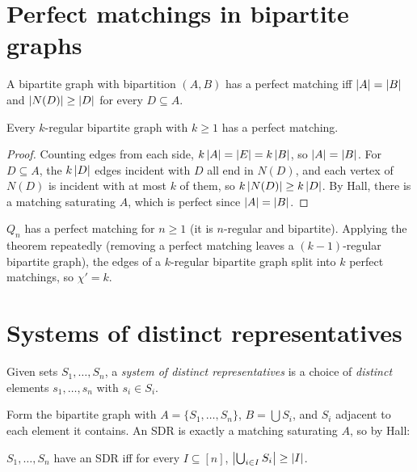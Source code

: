 \section{Perfect matchings in bipartite graphs}

\begin{corollary}
A bipartite graph with bipartition $(A,B)$ has a perfect matching iff $\left\lvert A \right\rvert = \left\lvert B \right\rvert$ and
$\left\lvert N(D) \right\rvert\ge\left\lvert D \right\rvert$ for every $D\subseteq A$.
\end{corollary}

\begin{theorem}
Every $k$-regular bipartite graph with $k\ge1$ has a perfect matching.
\end{theorem}
\begin{proof}
Counting edges from each side, $k\left\lvert A \right\rvert = \left\lvert E \right\rvert = k\left\lvert B \right\rvert$, so $\left\lvert A \right\rvert = \left\lvert B \right\rvert$. For
$D \subseteq A$, the $k\left\lvert D \right\rvert$ edges incident with $D$ all end in $N(D)$, and each vertex of
$N(D)$ is incident with at most $k$ of them, so $k\left\lvert N(D) \right\rvert \ge k\left\lvert D \right\rvert$. By Hall, there is a
matching saturating $A$, which is perfect since $\left\lvert A \right\rvert = \left\lvert B \right\rvert$.
\end{proof}

\begin{corollary}
$Q_n$ has a perfect matching for $n\ge1$ (it is $n$-regular and bipartite). Applying the theorem
repeatedly (removing a perfect matching leaves a $(k-1)$-regular bipartite graph), the edges of a
$k$-regular bipartite graph split into $k$ perfect matchings, so $\chi' = k$.
\end{corollary}

\section{Systems of distinct representatives}

\begin{definition}[SDR]
Given sets $S_1, \dots, S_n$, a \emph{system of distinct representatives} is a choice of
\emph{distinct} elements $s_1, \dots, s_n$ with $s_i \in S_i$.
\end{definition}

Form the bipartite graph with $A = \{S_1,\dots,S_n\}$, $B = \bigcup S_i$, and $S_i$ adjacent to
each element it contains. An SDR is exactly a matching saturating $A$, so by Hall:

\begin{corollary}
$S_1, \dots, S_n$ have an SDR iff for every $I \subseteq [n]$,
$\left\lvert \bigcup_{i\in I}S_i \right\rvert \ge \left\lvert I \right\rvert$.
\end{corollary}

